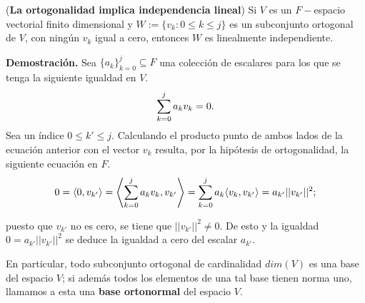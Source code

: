 \begin{prop}
(\textbf{La ortogonalidad implica independencia lineal})
Si $V$ es un $F-$espacio vectorial finito dimensional y 
$W :=\{ v_{k} : 0\leq k \leq j \}$ es un subconjunto ortogonal de
$V$, 
con ningún $v_{k}$ igual a cero, 
entonces $W$ es linealmente independiente.
\end{prop}
\noindent
\textbf{Demostración.}
Sea
$\{a_{k} \}_{k=0}^{j} \subseteq F$
una colección de escalares para los que se
tenga la siguiente igualdad en $V$.
\[
\sum\limits_{k=0}^{j}a_{k}v_{k} = 0.
\]
Sea un índice $0 \leq k' \leq j$.
Calculando el producto punto de ambos lados
de la ecuación anterior con el vector $v_{k}$
resulta, por la hipótesis de ortogonalidad, la
siguiente ecuación en $F$. 
\[
0 = 
\langle
0, v_{k'}
\rangle =
\left\langle
\suma{k=0}{j}{a_{k}v_{k}}
, v_{k'}
\right\rangle
= 
\suma{k=0}{j}{
a_{k}
\langle
v_{k}
, v_{k'}
\rangle
}
= 
a_{k'} ||v_{k'} ||^{2};
\]

puesto que $v_{k'}$ no es cero,
se tiene que 
$||v_{k'} ||^{2} \neq 0$. De esto y la igualdad 
$0 = a_{k'} ||v_{k'} ||^{2}$ se deduce la igualdad
a cero del escalar $a_{k'}$.
\QEDB
\vspace{0.2cm}

En particular, todo subconjunto ortogonal de cardinalidad
$dim(V)$ es una base del espacio $V$; si además todos los elementos
de una tal base tienen norma uno, llamamos a esta una
\textbf{base ortonormal} del espacio $V$. 



